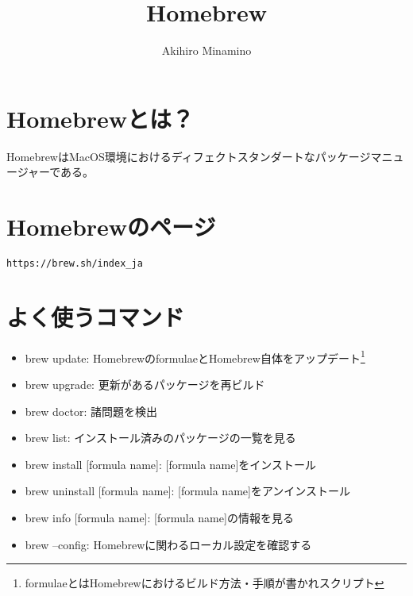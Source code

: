 \documentclass[11pt, oneside]{article}   	%
\title{Homebrew}
\author{Akihiro Minamino}
\begin{document}
\maketitle

\section{Homebrewとは？}
HomebrewはMacOS環境におけるディフェクトスタンダートなパッケージマニュージャーである。\\

\section{Homebrewのページ}
\verb|https://brew.sh/index_ja|\\

\section{よく使うコマンド}
\begin{itemize}
\item brew update: HomebrewのformulaeとHomebrew自体をアップデート\footnote{formulaeとはHomebrewにおけるビルド方法・手順が書かれスクリプト}
\item brew upgrade: 更新があるパッケージを再ビルド
\item brew doctor: 諸問題を検出
\item brew list: インストール済みのパッケージの一覧を見る
\item brew install [formula name]: [formula name]をインストール
\item brew uninstall [formula name]: [formula name]をアンインストール
\item brew info [formula name]: [formula name]の情報を見る
\item brew --config: Homebrewに関わるローカル設定を確認する
\end{itemize}


\end{document}
